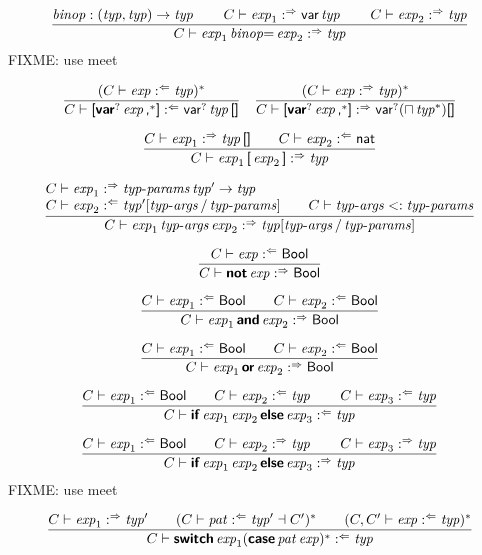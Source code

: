 $$
\frac{
  \x{binop} : (\x{typ}, \x{typ}) \Kto \x{typ}
  \qquad
  C \vdash \x{exp}_1 \synth \K{var} \x{typ}
  \qquad
  C \vdash \x{exp}_2 \synth \x{typ}
}{
  C \vdash \x{exp}_1 \x{binop}{\!\K=} \x{exp}_2 \synth \x{typ}
}
$$
FIXME: use meet

$$
\frac{
  (C \vdash \x{exp} \anal \x{typ})^\ast
}{
  C \vdash \K[ \KK{var}^? \x{exp}\K,^\ast \K] \anal \K{var}^? \x{typ} \K{[]}
}
\quad
\frac{
  (C \vdash \x{exp} \synth \x{typ})^\ast
}{
  C \vdash \K[ \KK{var}^? \x{exp}\K,^\ast \K] \synth \K{var}^? (\sqcap\x{typ}^\ast) \K{[]}
}
$$

$$
\frac{
  C \vdash \x{exp}_1 \synth \x{typ}\K{[]}
  \qquad
  C \vdash \x{exp}_2 \anal \K{nat}
}{
  C \vdash \x{exp}_1 \K[ \x{exp}_2 \K] \synth \x{typ}
}
$$

$$
\frac{
  \begin{array}{@{}l@{\qquad}l@{}}
  C \vdash \x{exp}_1 \synth \x{typ-params} \x{typ}' \Kto \x{typ}
  \\
  C \vdash \x{exp}_2 \anal \x{typ}'[\x{typ-args} / \x{typ-params}]
  &
  C \vdash \x{typ-args} \Ksub \x{typ-params}
  \end{array}
}{
  C \vdash \x{exp}_1 \x{typ-args} \x{exp}_2 \synth \x{typ}[\x{typ-args} / \x{typ-params}]
}
$$

$$
\frac{
  C \vdash \x{exp} \anal \K{Bool}
}{
  C \vdash \KK{not} \x{exp} \synth \K{Bool}
}
$$

$$
\frac{
  C \vdash \x{exp}_1 \anal \K{Bool}
  \qquad
  C \vdash \x{exp}_2 \anal \K{Bool}
}{
  C \vdash \x{exp}_1 \KK{and} \x{exp}_2 \synth \K{Bool}
}
$$

$$
\frac{
  C \vdash \x{exp}_1 \anal \K{Bool}
  \qquad
  C \vdash \x{exp}_2 \anal \K{Bool}
}{
  C \vdash \x{exp}_1 \KK{or} \x{exp}_2 \synth \K{Bool}
}
$$

$$
\frac{
  C \vdash \x{exp}_1 \anal \K{Bool}
  \qquad
  C \vdash \x{exp}_2 \anal \x{typ}
  \qquad
  C \vdash \x{exp}_3 \anal \x{typ}
}{
  C \vdash \KK{if} \x{exp}_1 \x{exp}_2 \KK{else} \x{exp}_3 \anal \x{typ}
}
$$

$$
\frac{
  C \vdash \x{exp}_1 \anal \K{Bool}
  \qquad
  C \vdash \x{exp}_2 \synth \x{typ}
  \qquad
  C \vdash \x{exp}_3 \synth \x{typ}
}{
  C \vdash \KK{if} \x{exp}_1 \x{exp}_2 \KK{else} \x{exp}_3 \synth \x{typ}
}
$$
FIXME: use meet

$$
\frac{
  C \vdash \x{exp}_1 \synth \x{typ}'
  \qquad
  (C \vdash \x{pat} \anal \x{typ}' \dashv C')^\ast
  \qquad
  (C, C' \vdash \x{exp} \anal \x{typ})^\ast
}{
  C \vdash \KK{switch} \x{exp}_1 (\KK{case} \x{pat} \x{exp})^\ast \anal \x{typ}
}
$$

